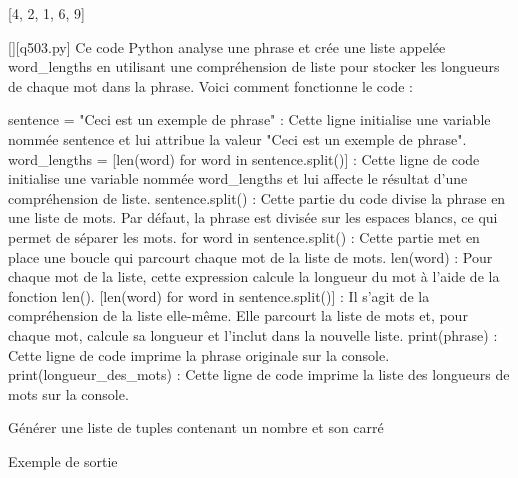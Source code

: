 [4, 2, 1, 6, 9]
        \par
        \begin{solution}
            \renewcommand{\nomfichier}{q503.py}
            \pythonfile{\chemincode \nomfichier}[][\nomfichier]
            Ce code Python analyse une phrase et crée une liste appelée word_lengths en utilisant une compréhension de liste pour stocker les longueurs de chaque mot dans la phrase. Voici comment fonctionne le code :

    sentence = "Ceci est un exemple de phrase" : Cette ligne initialise une variable nommée sentence et lui attribue la valeur "Ceci est un exemple de phrase".
    word_lengths = [len(word) for word in sentence.split()] : Cette ligne de code initialise une variable nommée word_lengths et lui affecte le résultat d'une compréhension de liste.
        sentence.split() : Cette partie du code divise la phrase en une liste de mots. Par défaut, la phrase est divisée sur les espaces blancs, ce qui permet de séparer les mots.
        for word in sentence.split() : Cette partie met en place une boucle qui parcourt chaque mot de la liste de mots.
        len(word) : Pour chaque mot de la liste, cette expression calcule la longueur du mot à l'aide de la fonction len().
        [len(word) for word in sentence.split()] : Il s'agit de la compréhension de la liste elle-même. Elle parcourt la liste de mots et, pour chaque mot, calcule sa longueur et l'inclut dans la nouvelle liste.
    print(phrase) : Cette ligne de code imprime la phrase originale sur la console.
    print(longueur_des_mots) : Cette ligne de code imprime la liste des longueurs de mots sur la console.
        \end{solution}
        

        \question
        Générer une liste de tuples contenant un nombre et son carré

Exemple de sortie

